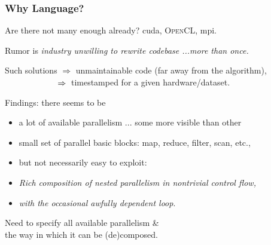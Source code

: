 \documentclass{beamer}
\newcommand{\emp}[1]{\textcolor{DikuRed}{ #1}}
\newcommand{\emphh}[1]{\textcolor{CosGreen}{ #1}}
\begin{document}
\begin{frame}
  \frametitle{Why Language?}

Are there not many enough already? {\sc cuda}, \textsc{OpenCL}, {\sc mpi}.\smallskip

Rumor is \emp{\em industry unwilling to rewrite codebase ...\pause more than once.}\smallskip

Such solutions $\Rightarrow$ unmaintainable code (far away from the algorithm),\\
$\mbox{\tt~~~~~~~~~~~~$\Rightarrow$~}$timestamped for a given hardware/dataset. 
\bigskip

Findings: there seems to be

\begin{itemize}

    \item a lot of available parallelism ... some more visible than other\smallskip

    \item small set of parallel basic blocks:
            map, reduce, filter, scan, etc.,\smallskip

    \item but not necessarily easy to exploit:\bigskip\pause

    \item \emphh{\em Rich composition of nested parallelism in nontrivial control flow,}\smallskip

    \item \emp{\em with the occasional awfully dependent loop}.\smallskip

\end{itemize}

\emphh{Need to specify all available parallelism \&\\ 
        the way in which it can be (de)composed.}

\end{frame}
\end{document}
